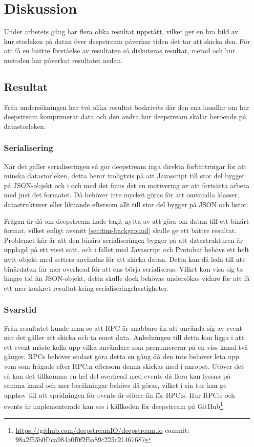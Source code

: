 \section{Diskussion}
\label{sec:tim-discussion}
Under arbetets gång har flera olika resultat uppstått, vilket ger en bra bild av hur storleken på datan över deepstream påverkar tiden det tar att skicka den. För att få en bättre förståelse av resultaten så diskuteras resultat, metod och hur metoden har påverkat resultatet nedan. 

\subsection{Resultat}
\label{subsec:tim-discussion-results}
Från undersökningen har två olika resultat beskrivits där den ena handlar om hur deepstream komprimerar data och den andra hur deepstream skalar beroende på datastorleken.

\subsubsection{Serialisering}
När det gäller serialiseringen så gör deepstream inga direkta förbättringar för att minska datastorleken, detta beror troligtvis på att Javascript till stor del bygger på JSON-objekt och i och med det finns det en motivering av att fortsätta arbeta med just det formatet. Då behöver inte mycket göras för att omvandla klasser, datastrukturer eller liknande eftersom allt till stor del bygger på JSON och listor.

Frågan är då om deepstream hade tagit nytta av att göra om datan till ett binärt format, vilket enligt avsnitt \ref{sec:tim-background} skulle ge ett bättre resultat. Problemet här är att den binära serialiseringen bygger på att datastrukturen är upplagd på ett visst sätt, och i fallet med Javascript och Protobuf behövs ett helt nytt objekt med setters användas för att skicka datan. Detta kan då leda till att binärdatan får mer overhead för att ens börja serialiseras. Vilket kan visa sig ta längre tid än JSON-objekt, detta skulle dock behövas undersökas vidare för att få ett mer konkret resultat kring serialiseringshastigheter.

\subsubsection{Svarstid}
Från resultatet kunde man se att RPC är snabbare än att använda sig av event när det gäller att skicka och ta emot data. Anledningen till detta kan ligga i att ett event måste kolla upp vilka användare som prenumererar på en viss kanal två gånger. RPCs behöver endast göra detta en gång då den inte behöver leta upp vem som frågade efter RPC:n eftersom denna skickas med i anropet. Utöver det så kan det tillkomma en hel del overhead med events då flera kan lyssna på samma kanal och mer beräkningar behövs då göras, vilket i sin tur kan ge upphov till att spridningen för events är större än för RPC:s. Hur RPC:s och events är implementerade kan ses i källkoden för deepstream på GitHub\footnote{\url{https://github.com/deepstreamIO/deepstream.io} \newline commit: 98a2f53b0f7ca984a0f0f2f5a89c225c21467687}. 

